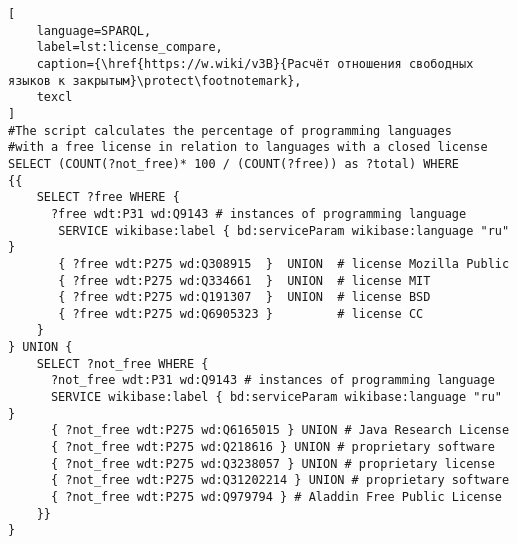 \begin{lstlisting}[
	language=SPARQL,
	label=lst:license_compare,
	caption={\href{https://w.wiki/v3B}{Расчёт отношения свободных языков к закрытым}\protect\footnotemark},
	texcl
]
#The script calculates the percentage of programming languages 
#with a free license in relation to languages with a closed license
SELECT (COUNT(?not_free)* 100 / (COUNT(?free)) as ?total) WHERE
{{
    SELECT ?free WHERE {
      ?free wdt:P31 wd:Q9143 # instances of programming language
       SERVICE wikibase:label { bd:serviceParam wikibase:language "ru" }
       { ?free wdt:P275 wd:Q308915  }  UNION  # license Mozilla Public
       { ?free wdt:P275 wd:Q334661  }  UNION  # license MIT
       { ?free wdt:P275 wd:Q191307  }  UNION  # license BSD
       { ?free wdt:P275 wd:Q6905323 }         # license CC
    }
} UNION {
    SELECT ?not_free WHERE {
      ?not_free wdt:P31 wd:Q9143 # instances of programming language
      SERVICE wikibase:label { bd:serviceParam wikibase:language "ru" }
      { ?not_free wdt:P275 wd:Q6165015 } UNION # Java Research License
      { ?not_free wdt:P275 wd:Q218616 } UNION # proprietary software
      { ?not_free wdt:P275 wd:Q3238057 } UNION # proprietary license 
      { ?not_free wdt:P275 wd:Q31202214 } UNION # proprietary software 
      { ?not_free wdt:P275 wd:Q979794 } # Aladdin Free Public License
    }}
}
\end{lstlisting}%

